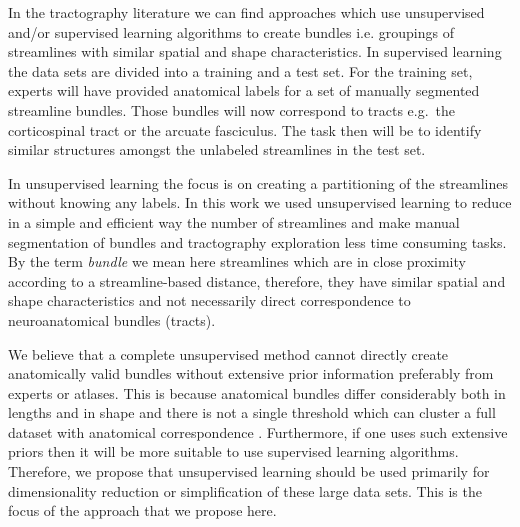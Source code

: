 \documentclass{bioinfo}
\begin{document}
In the tractography literature we can find approaches which use
unsupervised and/or supervised learning algorithms to create bundles
i.e. groupings of streamlines with similar spatial and shape
characteristics. In supervised learning the data sets are divided into a
training and a test set. For the training set, experts will have provided
anatomical labels for a set of manually segmented streamline
bundles. Those bundles will now correspond to tracts e.g.~the
corticospinal tract or the arcuate fasciculus. The task then will be to
identify similar structures amongst the unlabeled streamlines in the
test set.

In unsupervised learning the focus is on creating a partitioning of the
streamlines without knowing any labels. In this work we used
unsupervised learning to reduce in a simple and efficient way the number
of streamlines and make manual segmentation of bundles and tractography
exploration less time consuming tasks. By the term \emph{bundle} we mean
here streamlines which are in close proximity according to a
streamline-based distance, therefore, they have similar spatial and
shape characteristics and not necessarily direct correspondence to
neuroanatomical bundles (tracts).

We believe that a complete unsupervised method cannot directly create
anatomically valid bundles without extensive prior information
preferably from experts or atlases. This is because anatomical bundles
differ considerably both in lengths and in shape
\citep[see][]{schmahmann2009fiber} and there is not a single threshold
which can cluster a full dataset with anatomical correspondence
\citep[see][]{Guevara2010}. Furthermore, if one uses such extensive
priors then it will be more suitable to use supervised learning
algorithms. Therefore, we propose that unsupervised learning should be
used primarily for dimensionality reduction or simplification of these
large data sets. This is the focus of the approach that we propose
here.
\end{document}
